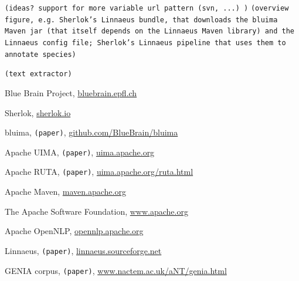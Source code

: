 \documentclass{article}
\newcommand{\TODO}[1]{\texttt{\textcolor{YellowOrange}{(#1)}}} %
\begin{document}
\TODO{ideas? support for more variable url pattern (svn, ...) }
\TODO{overview figure, e.g.  Sherlok's Linnaeus bundle, that downloads the bluima Maven jar (that itself depends on the Linnaeus Maven library) and the Linnaeus config file; Sherlok's Linnaeus pipeline that uses them to annotate species}

\TODO{text extractor}


\begin{thebibliography}{99}

    Blue Brain Project,
    \href{http://bluebrain.epfl.ch/}{bluebrain.epfl.ch}

    Sherlok,
    \href{http://sherlok.io}{sherlok.io}

    bluima,
	\TODO{paper},
    \href{https://github.com/BlueBrain/bluima}{github.com/BlueBrain/bluima}

    Apache UIMA,
	\TODO{paper},
    \href{https://uima.apache.org/}{uima.apache.org}

    Apache RUTA,
	\TODO{paper},
    \href{https://uima.apache.org/ruta.html}{uima.apache.org/ruta.html}

    Apache Maven,
    \href{https://maven.apache.org/}{maven.apache.org}

    The Apache Software Foundation,
    \href{http://www.apache.org/}{www.apache.org}

    Apache OpenNLP,
    \href{https://opennlp.apache.org/}{opennlp.apache.org}

    Linnaeus,
	\TODO{paper},
    \href{http://linnaeus.sourceforge.net/}{linnaeus.sourceforge.net}

    GENIA corpus,
	\TODO{paper},
    \href{http://www.nactem.ac.uk/aNT/genia.html}{www.nactem.ac.uk/aNT/genia.html}


\end{thebibliography}

\begin{appendix}
  \listoffigures
  \listoftables
\end{appendix}
\end{document}
